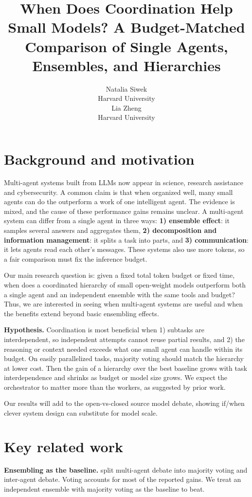 \documentclass{article}
\title{When Does Coordination Help Small Models? A Budget-Matched Comparison of Single Agents, Ensembles, and Hierarchies}
\author{%
  Natalia Siwek \\
  Harvard University \\
  \And
  Lia Zheng \\
  Harvard University \\
}
\begin{document}
\maketitle

\section{Background and motivation}

Multi-agent systems built from LLMs now appear in science, research assistance and cybersecurity. A common claim is that when organized well, many small agents can do the outperform a work of one intelligent agent. The evidence is mixed, and the cause of these performance gains remains unclear. A multi-agent system can differ from a single agent in three ways: \textbf{1) ensemble effect}: it samples several answers and aggregates them, \textbf{2) decomposition and information management}: it splits a task into parts, and \textbf{3) communication}: it lets agents read each other's messages. These systems also use more tokens, so a fair comparison must fix the inference budget.

Our main research question is: given a fixed total token budget or fixed time, when does a coordinated hierarchy of small open-weight models outperform both a single agent and an independent ensemble with the same tools and budget? Thus, we are interested in seeing when multi-agent systems are useful and when the benefits extend beyond basic ensembling effects.

\textbf{Hypothesis.} Coordination is most beneficial when 1) subtasks are interdependent, so independent attempts cannot reuse partial results, and 2) the reasoning or context needed exceeds what one small agent can handle within its budget. On easily parallelized tasks, majority voting should match the hierarchy at lower cost. Then the gain of a hierarchy over the best baseline grows with task interdependence and shrinks as budget or model size grows. We expect the orchestrator to matter more than the workers, as suggested by prior work.

Our results will add to the open-vs-closed source model debate, showing if/when clever system design can substitute for model scale.

\section{Key related work}

\textbf{Ensembling as the baseline.} \citet{choi2025debate} split multi-agent debate into majority voting and inter-agent debate. Voting accounts for most of the reported gains. We treat an independent ensemble with majority voting as the baseline to beat.
\end{document}
